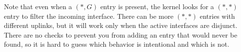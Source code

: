 Note that even when a $(*,G)$ entry is present, the kernel looks for a $(*,*)$
entry to filter the incoming interface. There can be more $(*,*)$ entries with
different uplinks, but it will work only when the active interfaces are
disjunct. There are no checks to prevent you from adding an entry that would
never be found, so it is hard to guess which behavior is intentional and which
is not.
